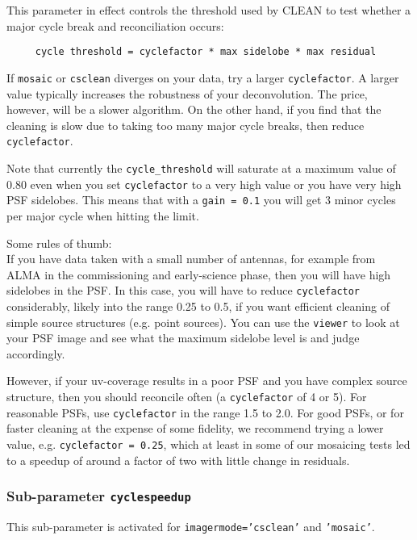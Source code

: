 This parameter in effect controls the threshold used by CLEAN to test whether
a major cycle break and reconciliation occurs:
\small
\begin{verbatim}
     cycle threshold = cyclefactor * max sidelobe * max residual
\end{verbatim}
\normalsize


If {\tt mosaic} or {\tt csclean} diverges on your data, try a larger
{\tt cyclefactor}. A larger value typically increases the
robustness of your deconvolution. The price, however, will be a slower
algorithm.  On the other hand, if you find that the cleaning is slow
due to taking too many major cycle breaks, then reduce
{\tt cyclefactor}.

Note that currently the {\tt cycle\_threshold} will saturate at a
maximum value of 0.80 even when you set {\tt cyclefactor} to a very
high value or you have very high PSF sidelobes.  This means that with
a {\tt gain = 0.1} you will get 3 minor cycles per major cycle when
hitting the limit.

\noindent Some rules of thumb:\\

If you have data taken with a small number of antennas, for example
from ALMA in the commissioning and early-science phase, then you will
have high sidelobes in the PSF.  In this case, you will have to reduce
{\tt cyclefactor} considerably, likely into the range 0.25 to 0.5,
if you want efficient cleaning of simple source structures (e.g. point
sources).  You can use the {\tt viewer} to look at your PSF image
and see what the maximum sidelobe level is and judge accordingly.

However, if your uv-coverage results in a poor PSF and you have
complex source structure, then you should reconcile often (a
{\tt cyclefactor} of 4 or 5). For reasonable PSFs, use
{\tt cyclefactor} in the range 1.5 to 2.0. For good PSFs, or for
faster cleaning at the expense of some fidelity, we recommend trying a
lower value, e.g. {\tt cyclefactor = 0.25}, which at least in some
of our mosaicing tests led to a speedup of around a factor of two with
little change in residuals. 

\subsubsection{Sub-parameter {\tt cyclespeedup} }
\label{section:im.clean.imagermode.cyclespeedup}

This sub-parameter is activated for {\tt imagermode='csclean'} and
{\tt 'mosaic'}.

